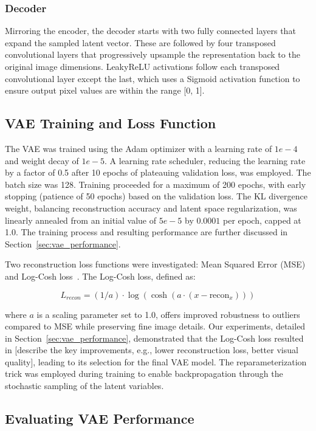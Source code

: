 \subsubsection{Decoder} \label{subsec:decoder}
Mirroring the encoder, the decoder starts with two fully connected layers that expand the sampled latent vector. These are followed by four transposed convolutional layers that progressively upsample the representation back to the original image dimensions.  LeakyReLU activations follow each transposed convolutional layer except the last, which uses a Sigmoid activation function to ensure output pixel values are within the range [0, 1].


\subsection{VAE Training and Loss Function} \label{sec:vae_training}

The VAE was trained using the Adam optimizer with a learning rate of $1e-4$ and weight decay of $1e-5$. A learning rate scheduler, reducing the learning rate by a factor of 0.5 after 10 epochs of plateauing validation loss, was employed. The batch size was 128. Training proceeded for a maximum of 200 epochs, with early stopping (patience of 50 epochs) based on the validation loss. The KL divergence weight, balancing reconstruction accuracy and latent space regularization, was linearly annealed from an initial value of $5e-5$ by $0.0001$ per epoch, capped at 1.0.  The training process and resulting performance are further discussed in Section~\ref{sec:vae_performance}. %

Two reconstruction loss functions were investigated: Mean Squared Error (MSE) and Log-Cosh loss~\cite{chen2019log}. The Log-Cosh loss, defined as:

$$L_{recon} = (1/a) \cdot \log(\cosh(a \cdot (x - \text{recon}_x)))$$

where $a$ is a scaling parameter set to 1.0, offers improved robustness to outliers compared to MSE while preserving fine image details.  Our experiments, detailed in Section~\ref{sec:vae_performance}, demonstrated that the Log-Cosh loss resulted in [describe the key improvements, e.g., lower reconstruction loss, better visual quality], leading to its selection for the final VAE model. The reparameterization trick was employed during training to enable backpropagation through the stochastic sampling of the latent variables.

\subsection{Evaluating VAE Performance}


